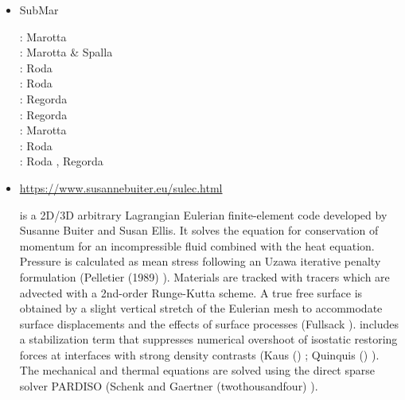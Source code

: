 \begin{itemize}
\item {\codefont SubMar} 

\begin{scriptsize}
\twothousandsix: Marotta \etal \cite{masr06}\\
\twothousandseven: Marotta \& Spalla \cite{masp07}\\
\twothousandten: Roda \etal \cite{roms10}\\
\twothousandtwelve: Roda \etal \cite{rosm12}\\
\twothousandthirteen: Regorda \etal \cite{rems13}\\
\twothousandseventeen: Regorda \etal \cite{rerm17}\\
\twothousandeighteen: Marotta \etal \cite{marc18}\\
\twothousandnineteen: Roda \etal \cite{rors19}\\
\twothousandtwenty: Roda \etal \cite{rozr20}, Regorda \etal \cite{relr20}
\end{scriptsize}


\item \sulec {}

\url{https://www.susannebuiter.eu/sulec.html}

\sulec is a 2D/3D arbitrary Lagrangian Eulerian finite-element 
code developed by Susanne Buiter and Susan Ellis. 
It solves the equation for conservation of momentum for an incompressible fluid combined with 
the heat equation. Pressure is calculated as mean stress following an Uzawa iterative penalty 
formulation (Pelletier \etal (1989) \cite{pefc89}). 
Materials are tracked with tracers which are advected with a 2nd-order Runge-Kutta scheme. 
A true free surface is obtained by a slight vertical stretch of the Eulerian mesh to 
accommodate surface displacements and the effects of surface processes (Fullsack \nineteenninetyfive \cite{full95}). 
\sulec includes a stabilization term that suppresses numerical overshoot of isostatic restoring forces 
at interfaces with strong density contrasts (Kaus \etal (\twothousandten) \cite{kamm10}; 
Quinquis \etal (\twothousandeleven) \cite{qube11}). The mechanical and thermal equations are solved using 
the direct sparse solver PARDISO (Schenk and Gaertner (twothousandfour) \cite{scga04}).


\end{itemize}
